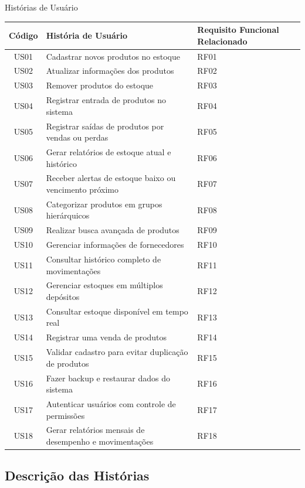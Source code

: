 \documentclass[
	12pt,				%
	openany,			%
	twoside,			%
	a4paper,			%
	english,			%
	brazil				%
	]{abntex2}
\begin{document}
\begin{quadro}[htb]
\caption{Histórias de Usuário}
\label{quadro_hist_usuarios}
\begin{tabular}{|c|p{10cm}|p{4cm}|}
\hline
\textbf{Código} & \textbf{História de Usuário} & \textbf{Requisito Funcional Relacionado} \\
\hline
US01 & Cadastrar novos produtos no estoque & RF01 \\ \hline
US02 & Atualizar informações dos produtos & RF02 \\ \hline
US03 & Remover produtos do estoque & RF03 \\ \hline
US04 & Registrar entrada de produtos no sistema & RF04 \\ \hline
US05 & Registrar saídas de produtos por vendas ou perdas & RF05 \\ \hline
US06 & Gerar relatórios de estoque atual e histórico & RF06 \\ \hline
US07 & Receber alertas de estoque baixo ou vencimento próximo & RF07 \\ \hline
US08 & Categorizar produtos em grupos hierárquicos & RF08 \\ \hline
US09 & Realizar busca avançada de produtos & RF09 \\ \hline
US10 & Gerenciar informações de fornecedores & RF10 \\ \hline
US11 & Consultar histórico completo de movimentações & RF11 \\ \hline
US12 & Gerenciar estoques em múltiplos depósitos & RF12 \\ \hline
US13 & Consultar estoque disponível em tempo real & RF13 \\ \hline
US14 & Registrar uma venda de produtos & RF14 \\ \hline
US15 & Validar cadastro para evitar duplicação de produtos & RF15 \\ \hline
US16 & Fazer backup e restaurar dados do sistema & RF16 \\ \hline
US17 & Autenticar usuários com controle de permissões & RF17 \\ \hline
US18 & Gerar relatórios mensais de desempenho e movimentações & RF18 \\
\hline
\end{tabular}
\end{quadro}

\FloatBarrier

\subsection{Descrição das Histórias}
\end{document}
